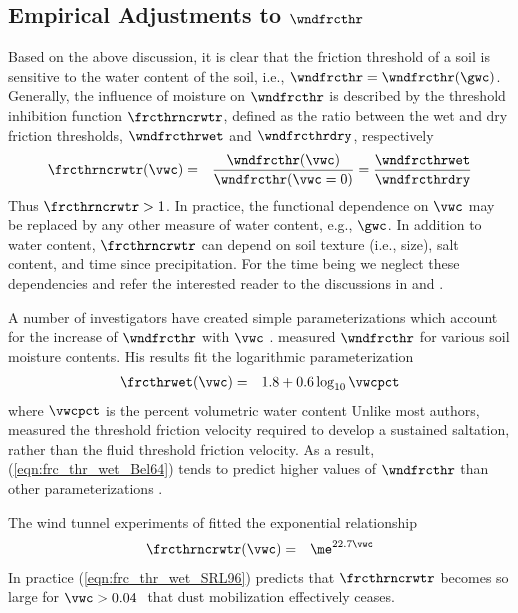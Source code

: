 \documentclass[12pt,twoside]{book}
\begin{document}
\subsection[Empirical Adjustments to Threshold Speed]{Empirical Adjustments to $\wndfrcthr$}\label{sxn:Bel64}
Based on the above discussion, it is clear that the friction threshold
of a soil is sensitive to the water content of the soil, i.e., 
$\wndfrcthr = \wndfrcthr(\gwc)$.
Generally, the influence of moisture on $\wndfrcthr$ is described by
the threshold inhibition function $\frcthrncrwtr$, defined as the ratio
between the wet and dry friction thresholds, $\wndfrcthrwet$ and
$\wndfrcthrdry$, respectively 
\begin{eqnarray}
\frcthrncrwtr (\vwc) & = & \frac{\wndfrcthr(\vwc)}{\wndfrcthr(\vwc = 0) }
= \frac{\wndfrcthrwet}{\wndfrcthrdry }
\label{eqn:frc_thr_wet_dfn}
\end{eqnarray}
Thus $\frcthrncrwtr > 1$.
In practice, the functional dependence on $\vwc$ may be replaced by
any other measure of water content, e.g., $\gwc$. 
In addition to water content, $\frcthrncrwtr$ can depend on soil
texture (i.e., size), salt content, and time since precipitation.
For the time being we neglect these dependencies and refer the
interested reader to the discussions in \cite{Pye87} and
\cite{Gil88}. 

A number of investigators have created simple parameterizations which  
account for the increase of $\wndfrcthr$ with $\vwc$
\cite[][]{Bel64,Pye87,Gil88,SeF95,SRL96,FMB99}.
\cite{Bel64} measured $\wndfrcthr$ for various soil moisture contents.  
His results fit the logarithmic parameterization
\begin{eqnarray}
\frcthrwet(\vwc) & = & 1.8 + 0.6 \log_{10} \vwcpct
\label{eqn:frc_thr_wet_Bel64}
\end{eqnarray}
where $\vwcpct$ is the percent volumetric water content
Unlike most authors, \cite{Bel64} measured the threshold friction
velocity required to develop a sustained saltation, rather than
the fluid threshold friction velocity.   
As a result, (\ref{eqn:frc_thr_wet_Bel64}) tends to predict higher
values of $\wndfrcthr$ than other parameterizations
\cite[][]{SRL96,FMB99}. 

The wind tunnel experiments of \cite{SRL96} fitted the exponential
relationship
\begin{eqnarray}
\frcthrncrwtr(\vwc) & = & \me^{ 22.7 \vwc }
\label{eqn:frc_thr_wet_SRL96}
\end{eqnarray}
In practice (\ref{eqn:frc_thr_wet_SRL96}) predicts that $\frcthrncrwtr$
becomes so large for $\vwc > 0.04$\,\mCxmC\ that dust mobilization
effectively ceases. 
\end{document}
